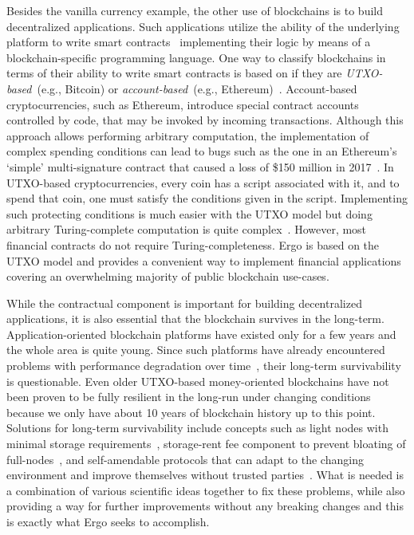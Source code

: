 Besides the vanilla currency example, the other use of blockchains is to build decentralized applications.
Such applications utilize the ability of the underlying platform to write smart contracts~\cite{szabo1994smart} implementing their logic by means of a blockchain-specific programming language.
One way to classify blockchains in terms of their ability to write smart contracts is based on if they are  
{\em UTXO-based}~(e.g., Bitcoin) or {\em account-based}~(e.g., Ethereum)~\cite{zahnentferner2018chimeric}. 
Account-based cryptocurrencies, such as Ethereum, introduce special contract accounts controlled by code,
that may be invoked by incoming transactions.
Although this approach allows performing arbitrary computation, the implementation of complex spending conditions
can lead to bugs such as the one in an Ethereum's `simple' multi-signature contract that caused a loss of \$150 million in 2017~\cite{parityLock}.
In UTXO-based cryptocurrencies, every coin has a script associated with it, and to spend that coin, one must satisfy the conditions given in the script. 
Implementing such protecting conditions is much easier with the UTXO model but doing arbitrary Turing-complete computation is quite complex~\cite{chepurnoy2018self}. However, most financial contracts do not require Turing-completeness. Ergo is based on the UTXO model and provides a convenient way to implement financial applications covering an
overwhelming majority of public blockchain use-cases.

While the contractual component is important for building decentralized applications,
it is also essential that the blockchain survives in the long-term.
Application-oriented blockchain platforms have existed only for a few years and the whole area is quite young. Since such platforms have already encountered problems with performance degradation over time~\cite{???}, their long-term survivability is questionable.
Even older UTXO-based money-oriented blockchains have not been proven to be fully resilient in the long-run
under changing conditions because we only have about 10 years of blockchain history up to this point.
Solutions for long-term survivability include concepts 
such as light nodes with minimal storage requirements~\cite{reyzin2017improving},
storage-rent fee component to prevent bloating of full-nodes~\cite{chepurnoy2018systematic}, and 
self-amendable protocols that can adapt to the changing environment and improve themselves without
trusted parties~\cite{goodman2014tezos}.
What is needed is a combination of various scientific ideas together to fix these problems, while also
providing a way for further improvements without any breaking changes and this is exactly what Ergo seeks to accomplish.

